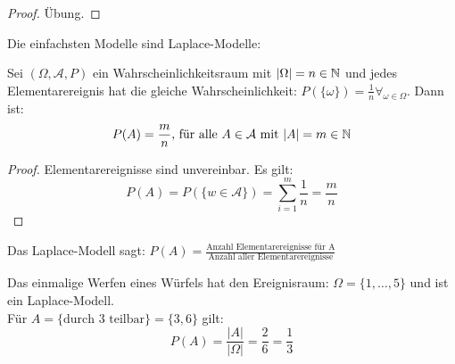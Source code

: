 \begin{proof}
Übung.
\end{proof}
Die einfachsten Modelle sind Laplace-Modelle:
\begin{theorem}
	Sei $(\Omega, \mathcal{A}, P)$ ein Wahrscheinlichkeitsraum mit $|\Omega|= n \in \mathbb{N}$ und jedes Elementarereignis hat die gleiche Wahrscheinlichkeit: $P(\{\omega\} ) = \frac{1}{n} \forall_{\omega \in \Omega}$. Dann ist:
	\[
		P(A) = \frac{m}{n} \text{, für alle } A \in \mathcal{A} \text{ mit }|A|=m \in \mathbb{N}
	\]
\end{theorem}
\begin{proof}
Elementarereignisse sind unvereinbar. Es gilt:
\[
	P(A) = P(\{w \in \mathcal{A}\} ) = \sum_{i=1}^{m}\frac{1}{n}=\frac{m}{n}
\]
\end{proof}
\begin{remark}
Das Laplace-Modell sagt: $P(A)= \frac{\text{Anzahl Elementarereignisse für A}}{\text{Anzahl aller Elementarereignisse}}$ 
\end{remark}
\begin{example}
Das einmalige Werfen eines Würfels hat den Ereignisraum: $\Omega = \{1,\ldots,5\} $ und ist ein Laplace-Modell.\\ 
Für $A = \{\text{durch 3 teilbar}\} = \{3,6\} $ gilt:
\[
P(A)=\frac{|A|}{|\Omega|}=\frac{2}{6}=\frac{1}{3}
\]
\end{example}
